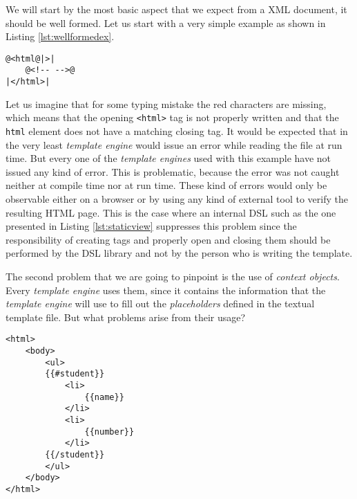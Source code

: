 \noindent
We will start by the most basic aspect that we expect from a \ac{XML} document, it should be well formed. Let us start with a very simple example as shown in Listing \ref{lst:wellformedex}.


\lstset{language = java}

\bigskip

\begin{minipage}{\linewidth}
\begin{lstlisting}[caption={Badly Formed HTML Document}, label={lst:wellformedex}, style=problemex]
@<html@|>|
	@<!-- -->@
|</html>|
\end{lstlisting}
\end{minipage} 

\noindent
Let us imagine that for some typing mistake the red characters are missing, which means that the opening \texttt{<html>} tag is not properly written and that the \texttt{html} element does not have a matching closing tag. It would be expected that in the very least \textit{template engine} would issue an error while reading the file at run time. But every one of the \textit{template engines} used with this example have not issued any kind of error. This is problematic, because the error was not caught neither at compile time nor at run time. These kind of errors would only be observable either on a browser or by using any kind of external tool to verify the resulting \ac{HTML} page. This is the case where an internal \ac{DSL} such as the one presented in Listing \ref{lst:staticview} suppresses this problem since the responsibility of creating tags and properly open and closing them should be performed by the \ac{DSL} library and not by the person who is writing the template.

\noindent
The second problem that we are going to pinpoint is the use of \textit{context objects}. Every \textit{template engine} uses them, since it contains the information that the \textit{template engine} will use to fill out the \textit{placeholders} defined in the textual template file. But what problems arise from their usage?

\bigskip


\begin{minipage}{\linewidth}
\begin{lstlisting}[caption={HTML Template with Placeholders}, label={lst:contextobjs}, style=problemex]
<html>
    <body>
        <ul>
        {{#student}}
            <li>
                {{name}}
            </li>
            <li>
                {{number}}
            </li>
        {{/student}}
        </ul>
    </body>
</html>
\end{lstlisting}
\end{minipage} 

